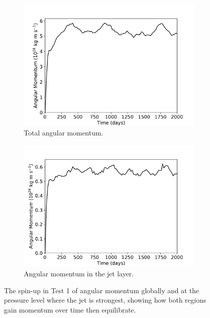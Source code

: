\begin{figure}
  \centering
  \begin{subfigure}[t]{0.48\textwidth}
    \includegraphics[width=1.0\textwidth]{figures/eqm-zonal-flow/global-m.pdf}
    \caption{Total angular momentum.}\label{fig:global-m}
  \end{subfigure}
\quad
  \begin{subfigure}[t]{0.48\textwidth}
    \includegraphics[width=1.0\textwidth]{figures/eqm-zonal-flow/jet-layer-m.pdf}
    \caption{Angular momentum in the jet layer.}\label{jet-layer-m}
  \end{subfigure}
  \caption{The spin-up in Test 1 of angular momentum globally and at the pressure level where the jet is strongest, showing how both regions gain momentum over time then equilibrate.}\label{fig:global-jet-layer-m-spinup}
\end{figure}

